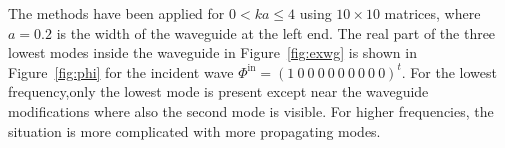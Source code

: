 \documentclass[numreferences]{kluwer}
\renewcommand{\Phi}{\varPhi}
\renewcommand{\Re}{\operatorname{Re}}
\renewcommand{\vec}[1]{\bm{#1}}
\renewcommand{\Phi}{\varPhi}
\newcommand{\Phiin}{\vec\Phi^{\text{in}}}
\begin{document}


The methods have been applied for $0<ka\le4$ using $10\times10$
matrices, where $a=0.2$ is the width of the waveguide at the left
end. The real part of the three lowest modes inside the waveguide in
Figure~\ref{fig:exwg} is shown in Figure~\ref{fig:phi} for the
incident wave $\Phiin=(1\ 0\ 0\ 0\ 0\ 0\ 0\ 0\ 0\ 0)^t$. For the lowest frequency,only the lowest mode is present except near the waveguide modifications where also the second mode is visible. For higher frequencies, the situation is more complicated with more propagating modes.
\end{document}
